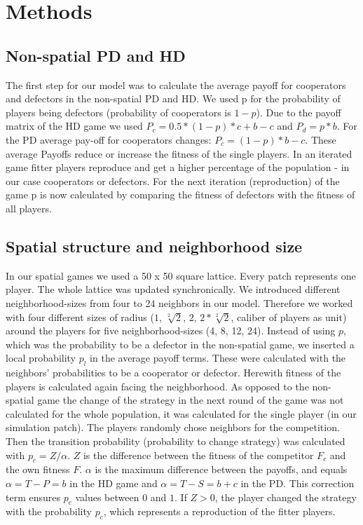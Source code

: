 \section{Methods}


\subsection{Non-spatial PD and HD}

The first step for our model was to calculate the average payoff for cooperators and defectors in the non-spatial PD and HD. We used p for the probability of players being defectors (probability of cooperators is $1-p$). Due to the payoff matrix of the HD game we used $P_{c}=0.5*(1-p)*c+b-c$ and $P_{d}=p*b$. For the PD average pay-off for cooperators changes: $P_{c}=(1-p)*b-c$. These average Payoffs reduce or increase the fitness of the single players. In an iterated game fitter players reproduce and get a higher percentage of the population - in our case cooperators or defectors. For the next iteration (reproduction) of the game p is now calculated by comparing the fitness of defectors with the fitness of all players.
 
\subsection{Spatial structure and neighborhood size}
In our spatial games we used a 50 x 50 square lattice. Every patch represents one player. The whole lattice was updated synchronically. We introduced different neighborhood-sizes from four to 24 neighbors in our model. Therefore we worked with four different sizes of radius ($1$, $\sqrt[2]{2}$, $2$, $2*\sqrt[2]{2}$, caliber of players as unit) around the players for five neighborhood-sizes (4, 8, 12, 24). Instead of using $p$, which was the probability to be a defector in the non-spatial game, we inserted a local probability $p_l$ in the average payoff terms. These were calculated with the neighbors' probabilities to be a cooperator or defector. Herewith fitness of the players is calculated again facing the neighborhood. As opposed to the non-spatial game the change of the strategy in the next round of the game was not calculated for the whole population, it was calculated for the single player (in our simulation patch). The players randomly chose neighbors for the competition. Then the transition probability (probability to change strategy) was calculated with $p_{c} = Z/\alpha$. $Z$ is the difference between the fitness of the competitor $F_c$ and the own fitness $F$. $\alpha$ is the maximum difference between the payoffs, and equals $\alpha=T-P=b$ in the HD game and $\alpha=T-S=b+c$ in the PD. This correction term ensures $p_{c}$ values between $0$ and $1$. If $Z>0$, the player changed the strategy with the probability $p_{c}$, which represents a reproduction of the fitter players.

